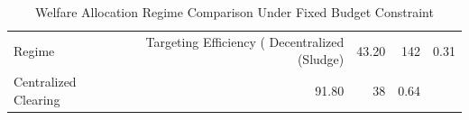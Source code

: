\begin{table}
\caption{Welfare Allocation Regime Comparison Under Fixed Budget Constraint}
\label{tab:allocation_mechanisms}
\begin{tabular}{lrrr}
\toprule
Regime & Targeting Efficiency (%
\midrule
Decentralized (Sludge) & 43.20 & 142 & 0.31 \\
Centralized Clearing & 91.80 & 38 & 0.64 \\
\bottomrule
\end{tabular}
\end{table}
